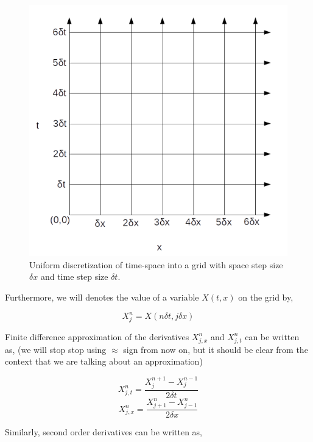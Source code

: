 \begin{figure}[hbt!]
    \centering
    \includegraphics[width=\textwidth]{images/grid.png}
    \caption{Uniform discretization of time-space into a grid with space step size $\delta x$ and time step size $\delta t$.}
    \label{fig:grid}
\end{figure}

Furthermore, we will denotes the value of a variable $X(t,x)$ on the grid by,

\begin{equation}
    X^{n}_{j}  = X(n \delta t, j \delta x)
\end{equation}

Finite difference approximation of the derivatives $X^n_{j,x}$ and $X^n_{j,t}$ can be written as, (we will stop stop using $\approx$ sign from now on, but it should be clear from the context that we are talking about an approximation)

\begin{equation}
    X^n_{j,t} = \frac{X^{n+1}_{j} - X^{n-1}_{j}}{2 \delta t}
\end{equation}
\begin{equation}
    X^n_{j,x} = \frac{X^n_{j+1} - X^n_{j-1}}{2 \delta x}
\end{equation}

Similarly, second order derivatives can be written as,


